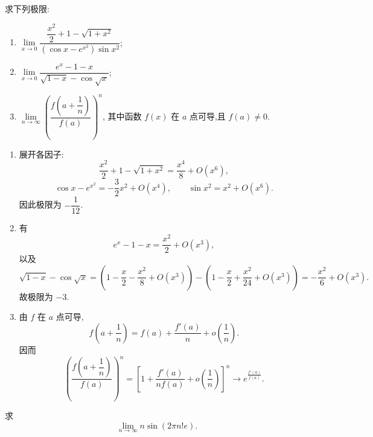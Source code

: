 \begin{example}
    求下列极限:
    \begin{enumerate}
        \item $\displaystyle
                  \lim\limits_{x\to0}
                  \dfrac{\dfrac{x^2}{2}+1-\sqrt{1+x^2}}
                  {(\cos x-e^{x^2})\sin x^2}$;
        \item $\displaystyle
                  \lim\limits_{x\to0}
                  \dfrac{e^x-1-x}{\sqrt{1-x}-\cos\sqrt{x}}$;
        \item $\displaystyle
                  \lim\limits_{n\to\infty}
                  \left(\dfrac{f\left(a+\dfrac{1}{n}\right)}{f(a)}\right)^n$,
              其中函数 $f(x)$ 在 $a$ 点可导,且 $f(a)\neq0$.
    \end{enumerate}
\end{example}
\exampleblank

\begin{solution}
    \begin{enumerate}
        \item 展开各因子:
              \[
                  \dfrac{x^2}{2}+1-\sqrt{1+x^2}
                  =\dfrac{x^4}{8}+O(x^6),
              \]
              \[
                  \cos x-e^{x^2}=-\dfrac{3}{2}x^2+O(x^4),
                  \qquad
                  \sin x^2=x^2+O(x^6).
              \]
              因此极限为 $-\dfrac{1}{12}$.
        \item 有
              \[
                  e^x-1-x=\dfrac{x^2}{2}+O(x^3),
              \]
              以及
              \[
                  \sqrt{1-x}-\cos\sqrt{x}
                  =\left(1-\dfrac{x}{2}-\dfrac{x^2}{8}+O(x^3)\right)
                  -\left(1-\dfrac{x}{2}+\dfrac{x^2}{24}+O(x^3)\right)
                  =-\dfrac{x^2}{6}+O(x^3).
              \]
              故极限为 $-3$.
        \item 由 $f$ 在 $a$ 点可导,
              \[
                  f\left(a+\dfrac{1}{n}\right)
                  =f(a)+\dfrac{f'(a)}{n}+o\left(\dfrac{1}{n}\right).
              \]
              因而
              \[
                  \left(\dfrac{f\left(a+\dfrac{1}{n}\right)}{f(a)}\right)^n
                  =\left[1+\dfrac{f'(a)}{nf(a)}+o\left(\dfrac{1}{n}\right)\right]^n
                  \longrightarrow e^{\frac{f'(a)}{f(a)}}.
              \]
    \end{enumerate}
\end{solution}

\begin{example}
    求
    \[
        \lim\limits_{n\to\infty}n\sin(2\pi n!e).
    \]
\end{example}
\exampleblank

